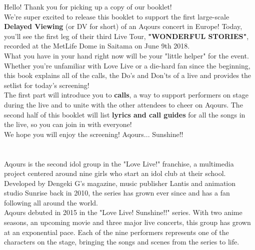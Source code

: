 \ifdefined\COMPLETE
\else
	
	
\fi

\def\pagetitletext{Welcome to WONDERFUL STORIES}

Hello! Thank you for picking up a copy of our booklet!\\

We’re super excited to release this booklet to support the first large-scale \textbf{Delayed Viewing} (or DV for short) of an Aqours concert in Europe! Today, you'll see the first leg of their third Live Tour, \textbf{"WONDERFUL STORIES"}, recorded at the MetLife Dome in Saitama on June 9th 2018.\\

What you have in your hand right now will be your "little helper" for the event. Whether you’re unfamiliar with Love Live or a die-hard fan since the beginning, this book explains all of the calls, the Do’s and Don'ts of a live and provides the setlist for today's screening!\\

The first part will introduce you to \textbf{calls}, a way to support performers on stage during the live and to unite with the other attendees to cheer on Aqours. The second half of this booklet will list \textbf{lyrics and call guides} for all the songs in the live, so you can join in with everyone!\\

We hope you will enjoy the screening! Aqours... Sunshine!!\\
\vspace{\fill}\\
\textbf{\large {}}\\

Aqours is the second idol group in the "Love Live!" franchise, a multimedia project centered around nine girls who start an idol club at their school. Developed by Dengeki G’s magazine, music publisher Lantis and animation studio Sunrise back in 2010, the series has grown ever since and has a fan following all around the world.\\

Aqours debuted in 2015 in the "Love Live! Sunshine!!" series. With two anime seasons, an upcoming movie and three major live concerts, this group has grown at an exponential pace. Each of the nine performers represents one of the characters on the stage, bringing the songs and scenes from the series to life.
\vspace{\fill}

\ifdefined\COMPLETE
\else
	
\fi